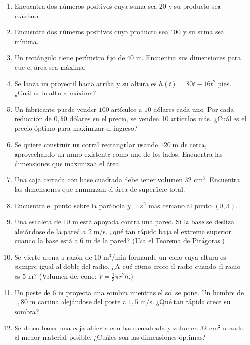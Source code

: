 \documentclass[12pt, letterpaper]{article}
\begin{document}
\begin{enumerate}[series=ejercicios, leftmargin=*]
  \item \facil{} Encuentra dos números positivos cuya suma sea $20$ y su producto sea máximo.

  \item \facil{} Encuentra dos números positivos cuyo producto sea $100$ y su suma sea mínima.

  \item \medio{} Un rectángulo tiene perímetro fijo de $40$ m. Encuentra sus dimensiones para que el área sea máxima.

  \item \medio{} Se lanza un proyectil hacia arriba y su altura es $h(t) = 80t - 16t^2$ pies. ¿Cuál es la altura máxima?

  \item \medio{} Un fabricante puede vender $100$ artículos a $10$ dólares cada uno. Por cada reducción de $0{,}50$ dólares en el precio, se venden 10 artículos más. ¿Cuál es el precio óptimo para maximizar el ingreso?

  \item \medio{} Se quiere construir un corral rectangular usando $120$ m de cerca, aprovechando un muro existente como uno de los lados. Encuentra las dimensiones que maximizan el área.

  \item \dificil{} Una caja cerrada con base cuadrada debe tener volumen $32$ cm$^3$. Encuentra las dimensiones que minimizan el área de superficie total.

  \item \dificil{} Encuentra el punto sobre la parábola $y = x^2$ más cercano al punto $(0, 3)$.

  \item \dificil{} Una escalera de $10$ m está apoyada contra una pared. Si la base se desliza alejándose de la pared a $2$ m/s, ¿qué tan rápido baja el extremo superior cuando la base está a $6$ m de la pared? (Usa el Teorema de Pitágoras.)

  \item \dificil{} Se vierte arena a razón de $10$ m$^3$/min formando un cono cuya altura es siempre igual al doble del radio. ¿A qué ritmo crece el radio cuando el radio es $5$ m? (Volumen del cono: $V = \frac{1}{3}\pi r^2 h$.)

  \item \dificil{} Un poste de $6$ m proyecta una sombra mientras el sol se pone. Un hombre de $1{,}80$ m camina alejándose del poste a $1{,}5$ m/s. ¿Qué tan rápido crece su sombra?

  \item \dificil{} Se desea hacer una caja abierta con base cuadrada y volumen $32$ cm$^3$ usando el menor material posible. ¿Cuáles son las dimensiones óptimas?
\end{enumerate}
\end{document}
